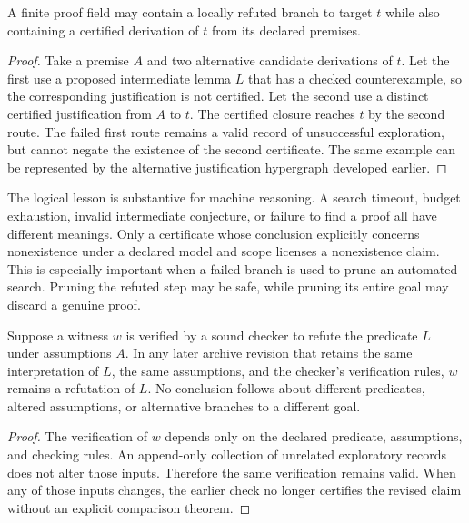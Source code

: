 \begin{PPTproposition}
\label{PPT:res:22:2}
A finite proof field may contain a locally refuted branch to target $t$ while also containing a certified derivation of $t$ from its declared premises.
\end{PPTproposition}
\begin{proof}
Take a premise $A$ and two alternative candidate derivations of $t$. Let the first use a proposed intermediate lemma $L$ that has a checked counterexample, so the corresponding justification is not certified. Let the second use a distinct certified justification from $A$ to $t$. The certified closure reaches $t$ by the second route. The failed first route remains a valid record of unsuccessful exploration, but cannot negate the existence of the second certificate. The same example can be represented by the alternative justification hypergraph developed earlier.
\end{proof}



The logical lesson is substantive for machine reasoning. A search timeout, budget exhaustion, invalid intermediate conjecture, or failure to find a proof all have different meanings. Only a certificate whose conclusion explicitly concerns nonexistence under a declared model and scope licenses a nonexistence claim. This is especially important when a failed branch is used to prune an automated search. Pruning the refuted step may be safe, while pruning its entire goal may discard a genuine proof.

\begin{PPTproposition}
\label{PPT:res:22:3}
Suppose a witness $w$ is verified by a sound checker to refute the predicate $L$ under assumptions $A$. In any later archive revision that retains the same interpretation of $L$, the same assumptions, and the checker's verification rules, $w$ remains a refutation of $L$. No conclusion follows about different predicates, altered assumptions, or alternative branches to a different goal.
\end{PPTproposition}
\begin{proof}
The verification of $w$ depends only on the declared predicate, assumptions, and checking rules. An append-only collection of unrelated exploratory records does not alter those inputs. Therefore the same verification remains valid. When any of those inputs changes, the earlier check no longer certifies the revised claim without an explicit comparison theorem.
\end{proof}

